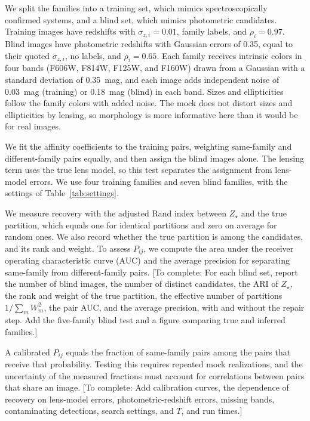 \documentclass[twocolumn,twocolappendix,linenumbers]{aastex701}
\newcommand{\todo}[1]{\textcolor{red!65!black}{[To complete: #1]}}
\begin{document}
We split the families into a training set, which mimics spectroscopically confirmed systems, and a blind set, which mimics photometric candidates.
Training images have redshifts with $\sigma_{z,i}=0.01$, family labels, and $\rho_i=0.97$.
Blind images have photometric redshifts with Gaussian errors of 0.35, equal to their quoted $\sigma_{z,i}$, no labels, and $\rho_i=0.65$.
Each family receives intrinsic colors in four bands (F606W, F814W, F125W, and F160W) drawn from a Gaussian with a standard deviation of 0.35~mag, and each image adds independent noise of 0.03~mag (training) or 0.18~mag (blind) in each band.
Sizes and ellipticities follow the family colors with added noise.
The mock does not distort sizes and ellipticities by lensing, so morphology is more informative here than it would be for real images.

We fit the affinity coefficients to the training pairs, weighting same-family and different-family pairs equally, and then assign the blind images alone.
The lensing term uses the true lens model, so this test separates the assignment from lens-model errors.
We use four training families and seven blind families, with the settings of Table~\ref{tab:settings}.

We measure recovery with the adjusted Rand index \citep[ARI;][]{Hubert1985} between $Z_\star$ and the true partition, which equals one for identical partitions and zero on average for random ones.
We also record whether the true partition is among the candidates, and its rank and weight.
To assess $P_{ij}$, we compute the area under the receiver operating characteristic curve (AUC) and the average precision for separating same-family from different-family pairs.
\todo{For each blind set, report the number of blind images, the number of distinct candidates, the ARI of $Z_\star$, the rank and weight of the true partition, the effective number of partitions $1/\sum_mW_m^2$, the pair AUC, and the average precision, with and without the repair step.
Add the five-family blind test and a figure comparing true and inferred families.}

A calibrated $P_{ij}$ equals the fraction of same-family pairs among the pairs that receive that probability.
Testing this requires repeated mock realizations, and the uncertainty of the measured fractions must account for correlations between pairs that share an image.
\todo{Add calibration curves, the dependence of recovery on lens-model errors, photometric-redshift errors, missing bands, contaminating detections, search settings, and $T$, and run times.}
\end{document}

